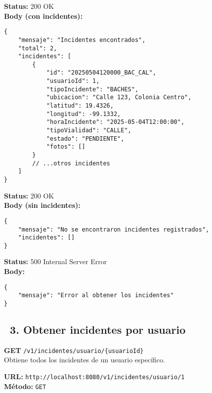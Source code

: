 \begin{tcolorbox}[response]
    \textbf{Status:} 200 OK\\
    \textbf{Body (con incidentes):}
    \begin{verbatim}
{
    "mensaje": "Incidentes encontrados",
    "total": 2,
    "incidentes": [
        {
            "id": "20250504120000_BAC_CAL",
            "usuarioId": 1,
            "tipoIncidente": "BACHES",
            "ubicacion": "Calle 123, Colonia Centro",
            "latitud": 19.4326,
            "longitud": -99.1332,
            "horaIncidente": "2025-05-04T12:00:00",
            "tipoVialidad": "CALLE",
            "estado": "PENDIENTE",
            "fotos": []
        }
        // ...otros incidentes
    ]
}
    \end{verbatim}
\end{tcolorbox}

\begin{tcolorbox}[response]
    \textbf{Status:} 200 OK\\
    \textbf{Body (sin incidentes):}
    \begin{verbatim}
{
    "mensaje": "No se encontraron incidentes registrados",
    "incidentes": []
}
    \end{verbatim}
\end{tcolorbox}

\begin{tcolorbox}[response]
    \textbf{Status:} 500 Internal Server Error\\
    \textbf{Body:}
    \begin{verbatim}
{
    "mensaje": "Error al obtener los incidentes"
}
    \end{verbatim}
\end{tcolorbox}

\subsection*{\faServer\ 3. Obtener incidentes por usuario}
\begin{tcolorbox}[endpoint]
    \textbf{GET} \texttt{/v1/incidentes/usuario/\{usuarioId\}}\\
    Obtiene todos los incidentes de un usuario específico.
\end{tcolorbox}

\begin{tcolorbox}[request]
    \textbf{URL:} \textcolor{urlColor}{\texttt{http://localhost:8080/v1/incidentes/usuario/1}}\\
    \textbf{Método:} \textcolor{methodColor}{\texttt{GET}}
\end{tcolorbox}

